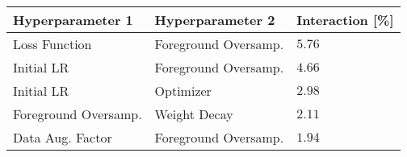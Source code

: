 \begin{tabular}{lll}
\toprule
Hyperparameter 1 & Hyperparameter 2 & Interaction [\%] \\
\midrule
Loss Function & Foreground Oversamp. & $5.76$ \\
Initial LR & Foreground Oversamp. & $4.66$ \\
Initial LR & Optimizer & $2.98$ \\
Foreground Oversamp. & Weight Decay & $2.11$ \\
Data Aug. Factor & Foreground Oversamp. & $1.94$ \\
\bottomrule
\end{tabular}
